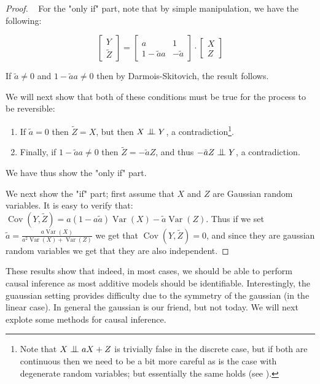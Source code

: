 \begin{proof} 
    ~
For the "only if" part, note that by simple manipulation, we have the following:

\[
    \begin{bmatrix}
        Y \\
        \tilde{Z}
    \end{bmatrix}
    =
    \begin{bmatrix}
    a & 1 \\
    1 - \tilde{a}a & -\tilde{a}
    \end{bmatrix}
    \cdot
    \begin{bmatrix}
        X \\
        Z
    \end{bmatrix}
\]

If $\tilde{a} \neq 0$ and $1 - \tilde{a}a \neq 0$ then by Darmois-Skitovich, the result follows.

We will next show that both of these conditions must be true for the process to be reversible:

\begin{enumerate}
    \item If $\tilde{a} = 0$ then $\tilde{Z} = X$, but then $X \bigCI Y$, a contradiction\footnote{
        Note that $X \bigCI aX + Z$ is trivially false 
        in the discrete case, but if both are continuous then we need to be a bit more careful as is the 
        case with degenerate random variables; but essentially the same holds (see \cite{Peters2008diploma}).
    }.
    \item Finally, if $1 - \tilde{a}a \neq 0$ then $\tilde{Z} = -\tilde{a}Z$, and thus 
    $-\tilde{a}Z \bigCI Y$, a contradiction.
\end{enumerate}

We have thus show the "only if" part. 

We next show the "if" part; first assume that $X$ and $Z$ are Gaussian random variables. 
It is easy to verify that:
$\operatorname{Cov}(Y, \tilde{Z}) = a(1 - a\tilde{a})\operatorname{Var}(X) - \tilde{a}\operatorname{Var}(Z)$.
Thus if we set $\tilde{a} = \frac{a \operatorname{Var}(X)}{a^2 \operatorname{Var}(X) + \operatorname{Var}(Z)}$ 
we get that $\operatorname{Cov}(Y, \tilde{Z}) = 0$, and since they are gaussian random variables we get 
that they are also independent.

\end{proof}

These results show that indeed, in most cases, we should be able to perform causal inference as most 
additive models should be identifiable. Interestingly, the guaussian setting provides difficulty  due 
to the symmetry of the gaussian (in the linear case). In general the gaussian is our friend, but not today.
We will next explote some methods for causal inference.

